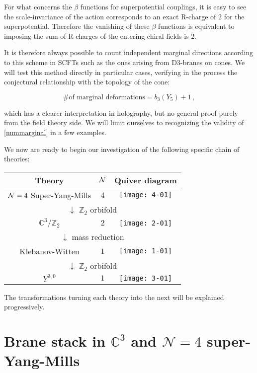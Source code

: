 For what concerns the $\beta$ functions for superpotential couplings, it is easy to see the scale-invariance of the action corresponds to an exact R-charge of $2$ for the superpotential. Therefore the vanishing of these $\beta$ functions is equivalent to imposing the sum of R-charges of the entering chiral fields is $2$.

It is therefore always possible to count independent marginal directions according to this scheme in SCFTs such as the ones arising from D3-branes on cones. We will test this method directly in particular cases, verifying in the process the conjectural relationship with the topology of the cone:

\begin{equation}
	\text{\# of marginal deformations} = b_3(Y_5) + 1\,,
	\label{nummarginal}
\end{equation}

which has a clearer interpretation in holography, but no general proof purely from the field theory side. We will limit ourselves to recognizing the validity of \eqref{nummarginal} in a few examples.

We now are ready to begin our investigation of the following specific chain of theories:

\begin{center}
\begin{tabular}{|c | c | c|}
	\hline
	Theory & $\mathcal{N}$ & Quiver diagram  \\
	\hline \hline
	$\mathcal{N} = 4$ Super-Yang-Mills & $4$ & \texttt{[image: 4-01]}\\ \hline 
	\multicolumn{3}{c}{ $\downarrow$ $\mathbb{Z}_2$ orbifold} \\ \hline
	$\mathbb{C}^3/\mathbb{Z}_2$ & $2$ & \texttt{[image: 2-01]} \\ \hline
	\multicolumn{3}{c}{ $\downarrow$ mass reduction} \\ \hline
	Klebanov-Witten & $1$ & \texttt{[image: 1-01]}\\ \hline
	\multicolumn{3}{c}{ $\downarrow$ $\mathbb{Z}_2$ orbifold} \\ \hline
	$Y^{2,0}$ & $1$ & \texttt{[image: 3-01]}\\ \hline
\end{tabular}
\end{center}

The transformations turning each theory into the next will be explained progressively.

\section{Brane stack in $\mathbb{C}^3$ and $\mathcal{N}=4$ super-Yang-Mills} \label{SYM4}

